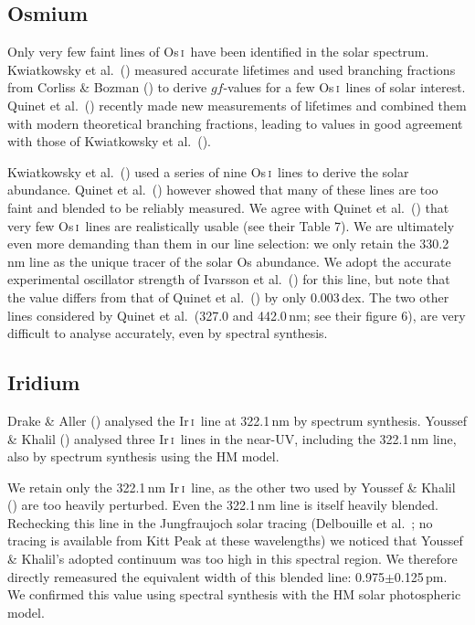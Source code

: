 \documentclass[traditabstract]{aa}
\newcommand{\altosi}{Os\,\textsc{i}}
\newcommand{\altiri}{Ir\,\textsc{i}}
\newcommand{\osi}{\altosi\ }
\newcommand{\iri}{\altiri\ }
\begin{document}
\subsection{Osmium}
Only very few faint lines of \osi have been identified in the solar spectrum. Kwiatkowsky et al.\ (\cite{kwia2}) measured accurate lifetimes and used branching fractions from Corliss \& Bozman (\cite{corl}) to derive $gf$-values for a few \osi lines of solar interest.  Quinet et al.\ (\cite{quin}) recently made new measurements of lifetimes and combined them with modern theoretical branching fractions, leading to values in good agreement with those of Kwiatkowsky et al.\ (\cite{kwia2}).  

Kwiatkowsky et al.\ (\cite{kwia2}) used a series of nine \osi lines to derive the solar abundance. Quinet et al.\ (\cite{quin}) however showed that many of these lines are too faint and blended to be reliably measured. We agree with Quinet et al.\ (\cite{quin}) that very few \osi lines are realistically usable (see their Table 7). We are ultimately even more demanding than them in our line selection: we only retain the 330.2\,nm line as the unique tracer of the solar Os abundance. We adopt the accurate experimental oscillator strength of Ivarsson et al.\ (\cite{ivar}) for this line, but note that the  value differs from that of Quinet et al.\ (\cite{quin}) by only 0.003\,dex.  The two other lines considered by Quinet et al.\ (327.0 and 442.0\,nm; see their figure 6), are very difficult to analyse accurately, even by spectral synthesis.

\subsection{Iridium}
Drake \& Aller (\cite{drake}) analysed the \iri line at 322.1\,nm by spectrum synthesis.  Youssef \& Khalil (\cite{yous2}) analysed three \iri lines in the near-UV, including the 322.1\,nm line, also by spectrum synthesis using the HM model.

We retain only the 322.1\,nm \iri line, as the other two used by Youssef \& Khalil (\cite{yous2}) are too heavily perturbed. Even the 322.1\,nm line is itself heavily blended. Rechecking this line in the Jungfraujoch solar tracing (Delbouille et al.\ \cite{delb1}; no tracing is available from Kitt
Peak at these wavelengths) we noticed that Youssef \& Khalil's adopted continuum was too high in this spectral region. We therefore directly remeasured the equivalent width of this blended line: 0.975$\pm$0.125\,pm.  We confirmed this value using spectral synthesis with the HM solar photospheric model.
\end{document}
